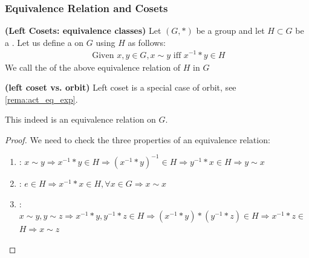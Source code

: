 \documentclass{article}
\newcommand{\bfs}[1]{\textbf{({#1}) }}
\begin{document}
\subsubsection{Equivalence Relation and Cosets}\label{sec:eq_coset}
\begin{defa}{\bfs{Left Cosets: equivalence classes}}
    Let $(G, *)$ be a group and let $H \subset G$ be a . Let us define a  on $G$ using $H$ as follows:
\begin{align*}
\text { Given } x, y \in G, x \sim y \text{ iff } x^{-1} * y \in H
\end{align*}
 We call the  of the above equivalence relation  of $H$ in $G$
\end{defa}
\begin{rema}{\bfs{left coset vs. orbit}}
Left coset is a special case of orbit, see \cref{rema:act_eq_exp}.
\end{rema}

\begin{lema}
This indeed is an equivalence relation on $G$.
\end{lema} 
\begin{proof}
We need to check the three properties of an equivalence relation:
\begin{enumerate}
    \item {}: $x \sim y \Rightarrow x^{-1} * y \in H \Rightarrow\left(x^{-1} * y\right)^{-1} \in H \Rightarrow y^{-1} * x \in H \Rightarrow y \sim x$
    \item {}: $e \in H \Rightarrow x^{-1} * x \in H, \forall x \in G \Rightarrow x \sim x$
    \item {}: $x \sim y, y \sim z \Rightarrow x^{-1} * y, y^{-1} * z \in H \Rightarrow\left(x^{-1} * y\right) *\left(y^{-1} * z\right) \in H \Rightarrow x^{-1} * z \in$
$H \Rightarrow x \sim z$
\end{enumerate}
\end{proof}
\end{document}
